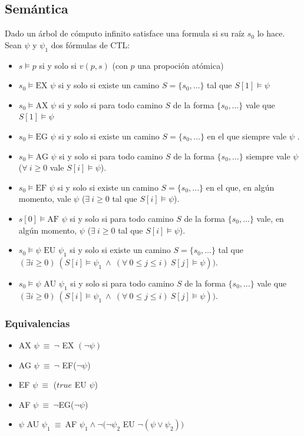 \subsection{Semántica}
Dado un árbol de cómputo infinito satisface una formula si su raíz $s_0$ lo hace. Sean $\psi$ y $\psi_1$ dos fórmulas de CTL:
\begin{itemize}
    \item $s \vDash p$ si y solo si $v(p,s)$ (con $p$ una propoción atómica)
    \item $s_0 \vDash \text{EX } \psi$ si y solo si existe un camino $S =\{s_0,\dots\}$ tal que $S[1]\vDash \psi$
    \item $s_0 \vDash \text{AX } \psi$ si y solo si para todo camino $S$ de la forma $\{s_0,\dots\}$ vale que $S[1]\vDash \psi$
    \item $s_0 \vDash \text{EG } \psi$ si y solo si existe un camino $S =\{s_0,\dots\}$ en el que siempre vale $\psi$ .
    \item $s_0 \vDash \text{AG } \psi$ si y solo si para todo camino $S$ de la forma $\{s_0,\dots\}$ siempre vale $\psi$ ($\forall~i\geq 0$ vale $S[i] \vDash \psi$).
    \item $s_0 \vDash \text{EF } \psi$ si y solo si existe un camino $S=\{s_0,...\}$ en el que, en algún momento, vale $\psi$ ($\exists~i\geq 0$ tal que  $S[i] \vDash \psi$).
    \item $s[0] \vDash \text{AF } \psi$ si y solo si para todo camino  $S$ de la forma $\{s_0,\dots\}$ vale, en algún momento, $\psi$ ($\exists~i\geq 0$ tal que  $S[i] \vDash \psi$).
    \item $s_0 \vDash \psi \text{ EU } \psi_1$ si y solo si existe un camino $S =\{s_0,\dots\}$ tal que \\\hspace*{1cm} $(\exists i\geq 0)~(S[i] \vDash \psi_1~\land~(\forall~ 0\leq j\leq i)~S[j]\vDash \psi))$.
    \item $s_0 \vDash \psi \text{ AU } \psi_1$ si y solo si para todo camino  $S$ de la forma $\{s_0,\dots\}$ vale que\\\hspace*{1cm} $(\exists i\geq 0)~(S[i] \vDash \psi_1~\land~(\forall~ 0\leq j\leq i)~S[j]\vDash \psi))$.
\end{itemize}

\subsubsection{Equivalencias}\label{sec::ctlEquivalencias}
\begin{itemize}
\item AX $\psi~\equiv~\lnot$ EX $(\lnot \psi)$
\item AG $\psi~\equiv~\lnot$ EF($\lnot \psi$)
\item EF $\psi~\equiv$ ($true$ EU $\psi$)
\item AF $\psi~\equiv~\lnot$EG($\lnot \psi$)
\item $\psi$ AU $\psi_1~\equiv~$AF $\psi_1 \land \lnot(\lnot \psi_2$ EU $\lnot(\psi\lor\psi_2))$
\end{itemize}
\newpage
